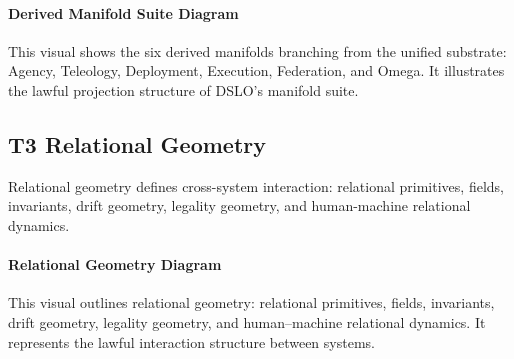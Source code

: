\paragraph{Derived Manifold Suite Diagram}
This visual shows the six derived manifolds branching from the unified substrate:
Agency, Teleology, Deployment, Execution, Federation, and Omega. It illustrates
the lawful projection structure of DSLO’s manifold suite.


\begin{center}
\end{center}


\subsection{T3 Relational Geometry}
Relational geometry defines cross-system interaction: relational primitives,
fields, invariants, drift geometry, legality geometry, and human-machine
relational dynamics.

\paragraph{Relational Geometry Diagram}
This visual outlines relational geometry: relational primitives, fields,
invariants, drift geometry, legality geometry, and human–machine relational
dynamics. It represents the lawful interaction structure between systems.


